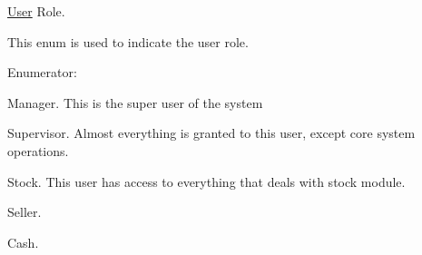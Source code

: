 \hyperlink{class_user}{\-User} \-Role. 

\-This enum is used to indicate the user role. \begin{Desc}
\item[\-Enumerator\-: ]\par
\begin{description}
\item[{\em 
\hypertarget{class_user_a43f49d6a3bf5f000aea476bc641949b0a5cabe47a239f4de61e963cad9085186a}{\-M\-A\-N\-A\-G\-E\-R}\label{class_user_a43f49d6a3bf5f000aea476bc641949b0a5cabe47a239f4de61e963cad9085186a}
}]\-Manager. \-This is the super user of the system \item[{\em 
\hypertarget{class_user_a43f49d6a3bf5f000aea476bc641949b0afc6d2f03c65ece2c4c0d23cb56715173}{\-S\-U\-P\-E\-R\-V\-I\-S\-O\-R}\label{class_user_a43f49d6a3bf5f000aea476bc641949b0afc6d2f03c65ece2c4c0d23cb56715173}
}]\-Supervisor. \-Almost everything is granted to this user, except core system operations. \item[{\em 
\hypertarget{class_user_a43f49d6a3bf5f000aea476bc641949b0a45f2c2b96e074703a1b0db034ee7a4b6}{\-S\-T\-O\-C\-K}\label{class_user_a43f49d6a3bf5f000aea476bc641949b0a45f2c2b96e074703a1b0db034ee7a4b6}
}]\-Stock. \-This user has access to everything that deals with stock module. \item[{\em 
\hypertarget{class_user_a43f49d6a3bf5f000aea476bc641949b0ab5c4888daf5151f7ae2b4c9a3e56d71a}{\-S\-E\-L\-L\-E\-R}\label{class_user_a43f49d6a3bf5f000aea476bc641949b0ab5c4888daf5151f7ae2b4c9a3e56d71a}
}]\-Seller. \item[{\em 
\hypertarget{class_user_a43f49d6a3bf5f000aea476bc641949b0af27b376d36b3828c197fa3d4ae855766}{\-C\-A\-S\-H}\label{class_user_a43f49d6a3bf5f000aea476bc641949b0af27b376d36b3828c197fa3d4ae855766}
}]\-Cash. \end{description}
\end{Desc}



